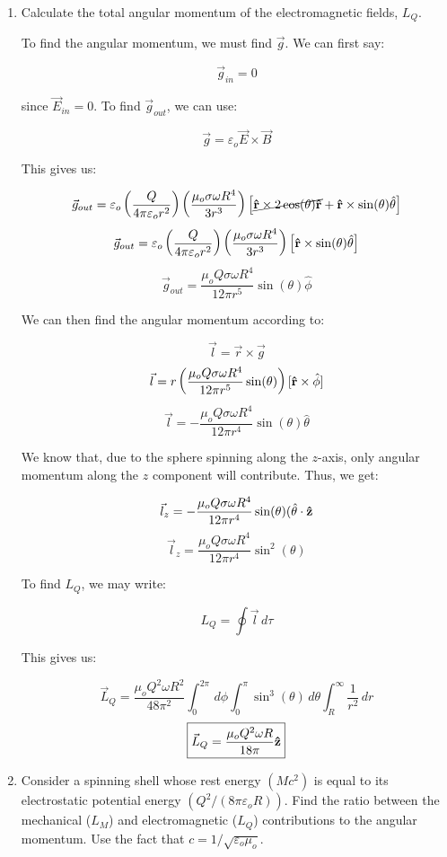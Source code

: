 \begin{enumerate}
\begin{enumerate}
      \item Calculate the total angular momentum of the electromagnetic fields, $L_Q$.

        To find the angular momentum, we must find $\vec{g}$. We can first say:

        $$\vec{g}_{in}=0$$

        since $\vec{E}_{in}=0$. To find $\vec{g}_{out}$, we can use:

        $$\vec{g}=\varepsilon_o\vec{E}\times\vec{B}$$

        This gives us:

        $$\vec{g}_{out}=\varepsilon_o\left(\frac{Q}{4\pi\varepsilon_o r^2}\right)\left( \frac{\mu_o\sigma\omega R^4}{3r^3} \right)\left[ \cancel{\bold{\hat{r}}\times 2\cos(\theta)\bold{\hat{r}}}+\bold{\hat{r}}\times\sin(\theta)\hat{\theta} \right]$$
        $$\vec{g}_{out}=\varepsilon_o\left(\frac{Q}{4\pi\varepsilon_o r^2}\right)\left( \frac{\mu_o\sigma\omega R^4}{3r^3} \right)\left[ \bold{\hat{r}}\times\sin(\theta)\hat{\theta} \right]$$
        $$\vec{g}_{out}=\frac{\mu_oQ\sigma\omega R^4}{12\pi r^5}\sin(\theta)\hat{\phi}$$

        We can then find the angular momentum according to:

        $$\vec{l}=\vec{r}\times\vec{g}$$
        $$\vec{l}=r\left( \frac{\mu_oQ\sigma\omega R^4}{12\pi r^5}\sin(\theta) \right)[\bold{\hat{r}}\times\hat{\phi}]$$
        $$\vec{l}=-\frac{\mu_oQ\sigma\omega R^4}{12\pi r^4}\sin(\theta)\hat{\theta}$$

        We know that, due to the sphere spinning along the $z$-axis, only angular momentum along the $z$ component will contribute. Thus, we get:

        $$\vec{l}_z=-\frac{\mu_oQ\sigma\omega R^4}{12\pi r^4}\sin(\theta)(\hat{\theta}\cdot\bold{\hat{z}}$$
        $$\vec{l}_z=\frac{\mu_oQ\sigma\omega R^4}{12\pi r^4}\sin^2(\theta)$$

        To find $L_Q$, we may write:

        $$L_Q=\oint \vec{l}\,d\tau$$

        This gives us:

        $$\vec{L}_Q=\frac{\mu_oQ^2\omega R^2}{48\pi^2}\int_0^{2\pi}\,d\phi\int_0^{\pi}\sin^3(\theta)\,d\theta\int_R^\infty \frac{1}{r^2}\,dr$$
        $$\boxed{\vec{L}_Q=\frac{\mu_oQ^2\omega R}{18\pi}\bold{\hat{z}}}$$

      \item Consider a spinning shell whose rest energy $(Mc^2)$ is equal to its electrostatic potential energy $(Q^2/(8\pi\varepsilon_o R))$. Find the ratio between the mechanical ($L_M$) and electromagnetic ($L_Q$) contributions to the angular momentum. Use the fact that $c=1/\sqrt{\varepsilon_o\mu_o}$.


\end{enumerate}
\end{enumerate}
